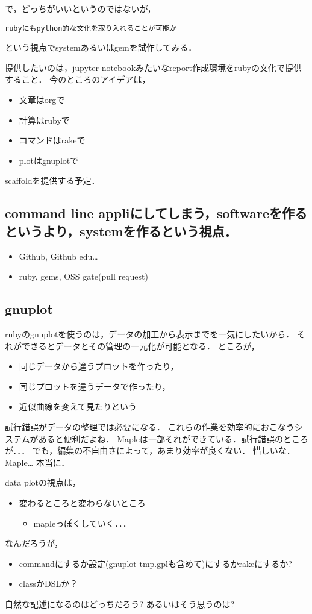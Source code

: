 \documentclass{jsarticle}
\begin{document}
で，どっちがいいというのではないが，
\begin{verbatim}
rubyにもpython的な文化を取り入れることが可能か
\end{verbatim}
という視点でsystemあるいはgemを試作してみる．

提供したいのは，jupyter notebookみたいなreport作成環境をrubyの文化で提供すること．
今のところのアイデアは，
\begin{itemize}
\item 文章はorgで
\item 計算はrubyで
\item コマンドはrakeで
\item plotはgnuplotで
\end{itemize}
scaffoldを提供する予定．
\subsection{command line appliにしてしまう，softwareを作るというより，systemを作るという視点．}
\label{sec-5-2}
\begin{itemize}
\item Github, Github edu\ldots{}
\item ruby, gems, OSS gate(pull request)
\end{itemize}

\subsection{gnuplot}
\label{sec-5-3}
rubyのgnuplotを使うのは，データの加工から表示までを一気にしたいから．
それができるとデータとその管理の一元化が可能となる．
ところが，
\begin{itemize}
\item 同じデータから違うプロットを作ったり，
\item 同じプロットを違うデータで作ったり，
\item 近似曲線を変えて見たりという
\end{itemize}
試行錯誤がデータの整理では必要になる．
これらの作業を効率的におこなうシステムがあると便利だよね．
Mapleは一部それができている．試行錯誤のところが．．．
でも，編集の不自由さによって，あまり効率が良くない．
惜しいな．Maple\ldots{} 本当に．

data plotの視点は，
\begin{itemize}
\item 変わるところと変わらないところ
\begin{itemize}
\item mapleっぽくしていく．．．
\end{itemize}
\end{itemize}
なんだろうが，
\begin{itemize}
\item commandにするか設定(gnuplot tmp.gplも含めて)にするかrakeにするか?
\item classかDSLか？
\end{itemize}
自然な記述になるのはどっちだろう? あるいはそう思うのは?
\end{document}
